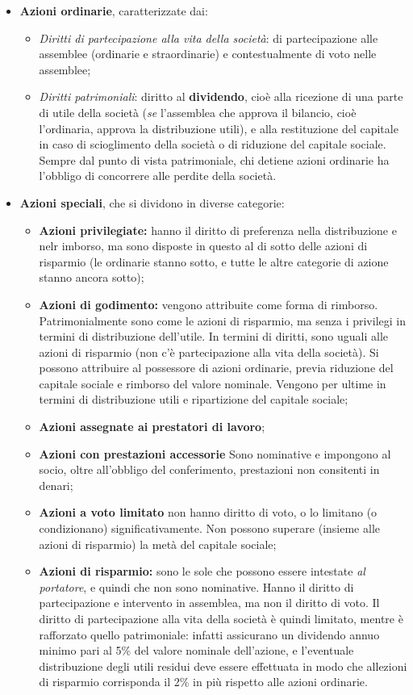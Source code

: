 \documentclass[a4paper,11pt]{article}
\begin{document}
\begin{itemize}
	\item \textbf{Azioni ordinarie}, caratterizzate dai:
	\begin{itemize}
		\item \textit{Diritti di partecipazione alla vita della società}: di partecipazione alle assemblee (ordinarie e straordinarie) e contestualmente di voto nelle assemblee;
		\item \textit{Diritti patrimoniali}: diritto al \textbf{dividendo}, cioè alla ricezione di una parte di utile della società (\textit{se} l'assemblea che approva il bilancio, cioè l'ordinaria, approva la distribuzione utili), e alla restituzione del capitale in caso di scioglimento della società o di riduzione del capitale sociale.
			Sempre dal punto di vista patrimoniale, chi detiene azioni ordinarie ha l'obbligo di concorrere alle perdite della società. 
	\end{itemize}
	\item \textbf{Azioni speciali}, che si dividono in diverse categorie:
		\begin{itemize}
			\item \textbf{Azioni privilegiate:} hanno il diritto di preferenza nella distribuzione e nelr imborso, ma sono disposte in questo al di sotto delle azioni di risparmio (le ordinarie stanno sotto, e tutte le altre categorie di azione stanno ancora sotto); 
			\item \textbf{Azioni di godimento:} vengono attribuite come forma di rimborso. Patrimonialmente sono come le azioni di risparmio, ma senza i privilegi in termini di distribuzione dell'utile. In termini di diritti, sono uguali alle azioni di risparmio (non c'è partecipazione alla vita della società). Si possono attribuire al possessore di azioni ordinarie, previa riduzione del capitale sociale e rimborso del valore nominale. Vengono per ultime in termini di distribuzione utili e ripartizione del capitale sociale;
			\item \textbf{Azioni assegnate ai prestatori di lavoro};
			\item \textbf{Azioni con prestazioni accessorie} Sono nominative e impongono al socio, oltre all'obbligo del conferimento, prestazioni non consitenti in denari;
			\item \textbf{Azioni a voto limitato} non hanno diritto di voto, o lo limitano (o condizionano) significativamente. Non possono superare (insieme alle azioni di risparmio) la metà del capitale sociale;
			\item \textbf{Azioni di risparmio:} sono le sole che possono essere intestate \textit{al portatore}, e quindi che non sono nominative.
				Hanno il diritto di partecipazione e intervento in assemblea, ma non il diritto di voto.
				Il diritto di partecipazione alla vita della società è quindi limitato, mentre è rafforzato quello patrimoniale: infatti assicurano un dividendo annuo minimo pari al 5\% del valore nominale dell'azione, e l'eventuale distribuzione degli utili residui deve essere effettuata in modo che allezioni di risparmio corrisponda il 2\% in più rispetto alle azioni ordinarie.


\end{itemize}
\end{itemize}
\end{document}
